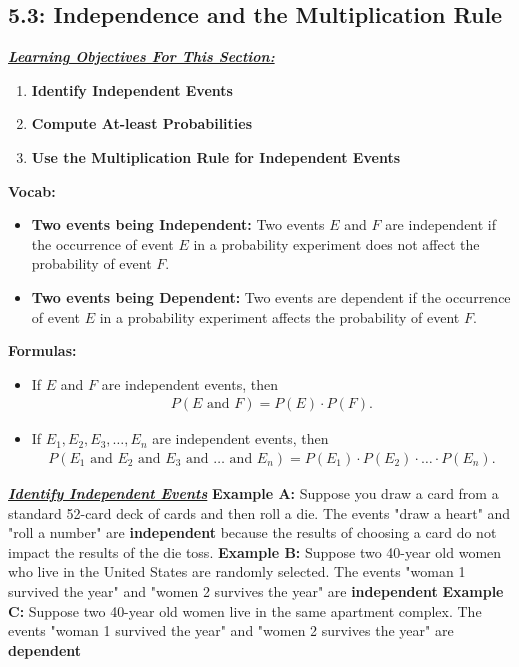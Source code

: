 \documentclass{report}
\begin{document}
    \subsection{ 5.3: Independence and the Multiplication Rule}
    \bigbreak \noindent 
    \textbf{\textit{\underline{Learning Objectives For This Section:}}}
    \begin{enumerate}
        \item \textbf{Identify Independent Events}
        \item \textbf{Compute At-least Probabilities}
        \item \textbf{Use the Multiplication Rule for Independent Events}
    \end{enumerate}
    \bigbreak \noindent 
    \textbf{Vocab:}
    \begin{itemize}
        \item \textbf{Two events being Independent: } Two events $E$ and $F$ are independent if the occurrence of event $E$ in a probability experiment does not affect the probability of event $F $.
        \item \textbf{Two events being Dependent:} Two events are dependent if the occurrence of event $E $ in a probability experiment affects the probability of event $F$.
    \end{itemize}
    \bigbreak \noindent 
    \textbf{Formulas:}
    \begin{itemize}
        \item If $E$ and $F$ are independent events, then
    \begin{align*}
         P(E \text{ and } F) = P(E) \cdot P(F) 
    .\end{align*}
    \bigbreak \noindent 
    \item If $E_1, E_2, E_3, \ldots, E_n$ are independent events, then
    \begin{align*}
         P(E_1 \text{ and } E_2 \text{ and } E_3 \text{ and } \ldots \text{ and } E_n) = P(E_1) \cdot P(E_2) \cdot \ldots \cdot P(E_n)
    .\end{align*}

        
    \end{itemize}
    \pagebreak \bigbreak \noindent
    \textbf{\textit{\underline{Identify Independent Events}}}
    \bigbreak \noindent 
    \textbf{Example A:} Suppose you draw a card from a standard 52-card deck of cards and then roll a die. The events "draw a heart" and "roll a number" are \textbf{independent} because the results of choosing a card do not impact the results of the die toss.
    \bigbreak \noindent 
    \textbf{Example B:} Suppose two 40-year old women who live in the United States are randomly selected. The events "woman 1 survived the year" and "women 2 survives the year" are \textbf{independent}
    \bigbreak \noindent 
    \textbf{Example C:} Suppose two 40-year old women live in the same apartment complex. The events "woman 1 survived the year" and "women 2 survives the year" are \textbf{dependent}
      
\end{document}
